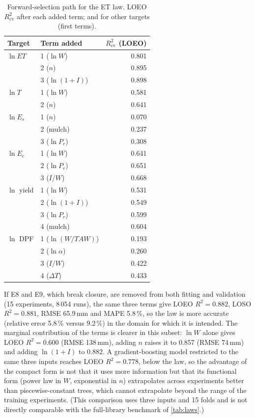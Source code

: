 \documentclass[preprint,12pt,authoryear]{elsarticle}
\newcommand{\TAW}{\mathit{TAW}}
\begin{document}
\begin{table}[H]\centering\small
\caption{Forward-selection path for the ET law. LOEO $R^2_{\mathrm{cv}}$ after each added term; and for other targets (first terms).}
\label{tab:path}
\begin{tabular}{llr}
\toprule
Target & Term added & $R^2_{\mathrm{cv}}$ (LOEO)\\\midrule
$\ln\mathit{ET}$ & 1 ($\ln W$) & 0.801\\
 & 2 ($n$) & 0.895\\
 & 3 ($\ln(1+I)$) & 0.898\\
$\ln T$ & 1 ($\ln W$) & 0.581\\
 & 2 ($n$) & 0.641\\
$\ln E_s$ & 1 ($n$) & 0.070\\
 & 2 (mulch) & 0.237\\
 & 3 ($\ln P_r$) & 0.308\\
$\ln E_c$ & 1 ($\ln W$) & 0.641\\
 & 2 ($\ln P_r$) & 0.651\\
 & 3 ($I/W$) & 0.668\\
$\ln$ yield & 1 ($\ln W$) & 0.531\\
 & 2 ($\ln(1+I)$) & 0.549\\
 & 3 ($\ln P_r$) & 0.599\\
 & 4 (mulch) & 0.604\\
$\ln$ DPF & 1 ($\ln(W/\TAW)$) & 0.193\\
 & 2 ($\ln\alpha$) & 0.260\\
 & 3 ($I/W$) & 0.422\\
 & 4 ($\Delta T$) & 0.433\\\bottomrule
\end{tabular}
\end{table}

If E8 and E9, which break closure, are removed from both fitting and validation (15 experiments, 8\,054 runs), the same three terms give LOEO $R^2=0.882$, LOSO $R^2=0.881$, RMSE 65.9\,mm and MAPE 5.8\,\%, so the law is more accurate (relative error 5.8\,\% versus 9.2\,\%) in the domain for which it is intended. The marginal contribution of the terms is clearer in this subset: $\ln W$ alone gives LOEO $R^2=0.600$ (RMSE 138\,mm), adding $n$ raises it to 0.857 (RMSE 74\,mm) and adding $\ln(1+I)$ to 0.882. A gradient-boosting model restricted to the same three inputs reaches LOEO $R^2=0.778$, below the law, so the advantage of the compact form is not that it uses more information but that its functional form (power law in $W$, exponential in $n$) extrapolates across experiments better than piecewise-constant trees, which cannot extrapolate beyond the range of the training experiments. (This comparison uses three inputs and 15 folds and is not directly comparable with the full-library benchmark of \cref{tab:laws}.)
\end{document}
